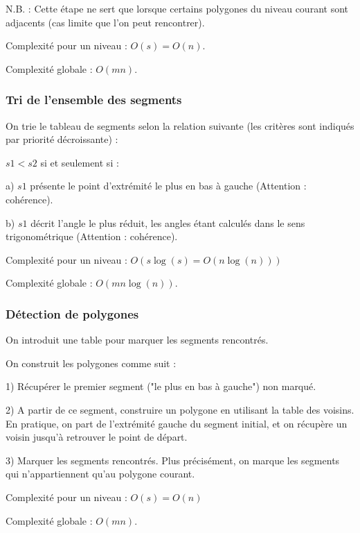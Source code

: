 \documentclass{article}
\begin{document}
N.B. : Cette étape ne sert que lorsque certains polygones du niveau courant sont adjacents (cas limite que l'on peut rencontrer).

Complexité pour un niveau : $O(s) =  O(n)$.

Complexité globale : $O(mn)$.

\subsubsection{Tri de l'ensemble des segments}

On trie le tableau de segments selon la relation suivante (les critères sont indiqués par priorité décroissante) :

$s1 < s2$ si et seulement si :

a) $s1$ présente le point d’extrémité le plus en bas à gauche (Attention : cohérence).

b) $s1$ décrit l'angle le plus réduit, les angles étant calculés dans le sens trigonométrique (Attention : cohérence).

Complexité pour un niveau : $O(s\log(s) = O(n\log(n)))$

Complexité globale : $O(mn\log(n))$.

\subsubsection{Détection de polygones}

On introduit une table pour marquer les segments rencontrés.

On construit les polygones comme suit :

1) Récupérer le premier segment ("le plus en bas à gauche") non marqué.

2) A partir de ce segment, construire un polygone en utilisant la table des voisins. En pratique, on part de l'extrémité gauche du segment initial, et on récupère un voisin jusqu'à retrouver le point de départ.

3) Marquer les segments rencontrés. Plus précisément, on marque les segments qui n'appartiennent qu'au polygone courant.

Complexité pour un niveau : $O(s) = O(n)$

Complexité globale : $O(mn)$.
\end{document}
